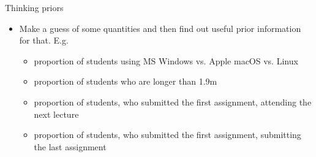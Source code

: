 \documentclass[english,t]{beamer}
\begin{document}
\begin{frame}{Thinking priors}

  \begin{itemize}
  \item Make a guess of some quantities and then find out useful
    prior information for that. E.g.
    \begin{itemize}
    \item proportion of students using MS Windows vs. Apple macOS vs. Linux
    \item proportion of students who are longer than 1.9m
    \item proportion of students, who submitted the first assignment,
      attending the next lecture
    \item proportion of students, who submitted the first assignment,
      submitting the last assignment
    \end{itemize}
  \end{itemize}
  
\end{frame}
\end{document}
